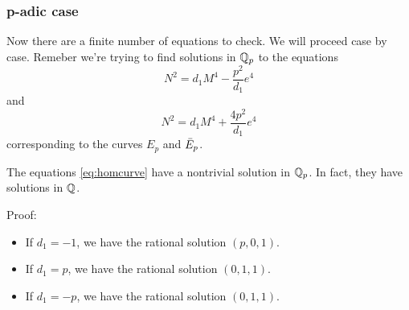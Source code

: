\documentclass[12pt, a4paper]{amsart}
\begin{document}
\subsubsection{p-adic case}
Now there are a finite number of equations to check. We will proceed case by
case. Remeber we're trying to find solutions in ${\mathbb Q}_p$ to the equations
\begin{equation} \label{eq:homcurve}
  N^2 = d_1 M^4 - \frac{p^2}{d_1}e^4
\end{equation}
and
\begin{equation} \label{eq:isocurve}
  N^2 = d_1 M^4 + \frac{4p^2}{d_1}e^4
\end{equation}
corresponding to the curves $E_p$ and $\bar{E}_p$.

\begin{thm}
  The equations \ref{eq:homcurve} have a nontrivial solution in ${\mathbb Q}_p$. In fact,
  they have solutions in ${\mathbb Q}$.
\end{thm}
Proof:
\begin{itemize}
\item If $d_1 = -1$, we have the rational solution $(p, 0, 1)$.
\item If $d_1 = p$, we have the rational solution $(0, 1, 1)$.
\item If $d_1 = -p$, we have the rational solution $(0, 1, 1)$.
\end{itemize}
\qedhere
\end{document}
